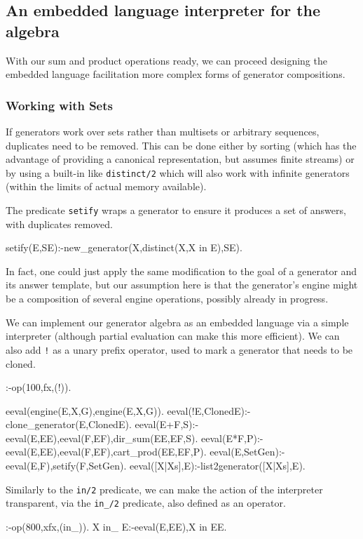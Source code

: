 \documentclass{new_tlp}
\begin{document}
\subsection{An embedded language interpreter for the algebra}

With our sum and product operations ready, we can proceed designing the embedded language
facilitation more complex forms of generator compositions.

\subsubsection{Working with Sets}

If generators work over sets rather than multisets or arbitrary sequences,
duplicates need to be removed. This can be done either by sorting (which has the advantage
of providing a canonical representation, but assumes finite streams) or by using  a built-in like {\tt distinct/2} which will also work with infinite generators (within the limits of actual memory available).

The predicate {\tt setify} wraps a generator to ensure it produces a set of answers, with duplicates removed.
\begin{code}
setify(E,SE):-new_generator(X,distinct(X,X in E),SE).
\end{code}
In fact, one could just apply the same modification to the goal of a generator and its answer template, but our assumption here is that the generator's engine might be a composition of several engine operations, possibly already in progress.

We can implement our generator algebra as an embedded language via a simple interpreter
(although partial evaluation can make this more efficient). We can also add {\tt !} as a unary prefix operator, used to mark a generator that needs to be cloned.

\begin{code}
:-op(100,fx,(!)).

eeval(engine(E,X,G),engine(E,X,G)).
eeval(!E,ClonedE):-clone_generator(E,ClonedE).
eeval(E+F,S):-eeval(E,EE),eeval(F,EF),dir_sum(EE,EF,S).
eeval(E*F,P):-eeval(E,EE),eeval(F,EF),cart_prod(EE,EF,P).
eeval({E},SetGen):-eeval(E,F),setify(F,SetGen).
eeval([X|Xs],E):-list2generator([X|Xs],E).
\end{code}
Similarly to the {\tt in/2} predicate, we can make the action of the
interpreter transparent, via the {\tt in\_/2} predicate, also defined as an operator.
\begin{code}
:-op(800,xfx,(in_)).
X in_ E:-eeval(E,EE),X in EE.     
\end{code}
\end{document}
